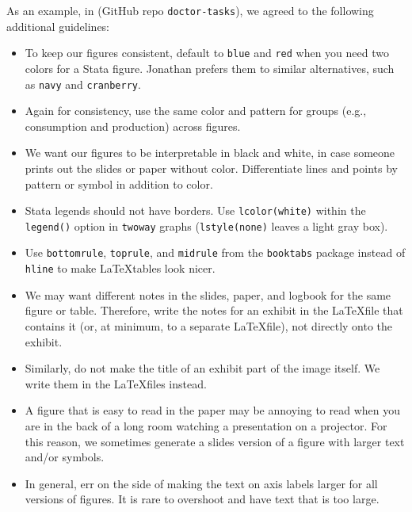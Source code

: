 As an example, in \citet{DGLM} (GitHub repo \texttt{doctor-tasks}), we agreed to the following additional guidelines:
\begin{itemize}
    \item To keep our figures consistent, default to \texttt{blue} and \texttt{red}
         when you need two colors for a Stata figure.
        Jonathan prefers them to similar alternatives, such as \texttt{navy} and \texttt{cranberry}.
    \item Again for consistency, use the same color and pattern
        for groups (e.g., consumption and production) across figures.
    \item We want our figures to be interpretable in black and white, in case
        someone prints out the slides or paper without color.
        Differentiate lines and points by pattern or symbol in addition to color.
    \item Stata legends should not have borders.
        Use \texttt{lcolor(white)} within the \texttt{legend()} option in \texttt{twoway} graphs
        (\texttt{lstyle(none)} leaves a light gray box).
    \item Use \texttt{bottomrule}, \texttt{toprule}, and \texttt{midrule} from the \texttt{booktabs} package
        instead of \texttt{hline} to make \LaTeX\:tables look nicer.
    \item We may want different notes in the slides, paper, and logbook for the same figure or table.
        Therefore, write the notes for an exhibit in the \LaTeX\:file that contains it
        (or, at minimum, to a separate \LaTeX\:file), not directly onto the exhibit.
    \item Similarly, do not make the title of an exhibit part of the image itself.
        We write them in the \LaTeX\:files instead.
    \item A figure that is easy to read in the paper may be annoying to read
        when you are in the back of a long room watching a presentation on a projector.
        For this reason, we sometimes generate a slides version of a figure with larger text and/or symbols.
    \item In general, err on the side of making the text on axis labels larger for all versions of figures.
        It is rare to overshoot and have text that is too large.
\end{itemize}
